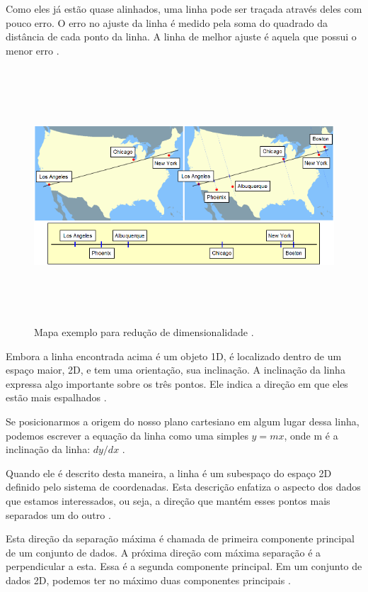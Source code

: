 Como eles já estão quase alinhados, uma linha pode ser traçada através deles com pouco erro. O erro no ajuste da linha é medido pela soma do quadrado da distância de cada ponto da linha. A linha de melhor ajuste é aquela que possui o menor erro \cite{hewitt}.

	\begin{figure}[hbt]
		\begin{center}
			\includegraphics[height=9.5cm,width=12.5cm]{figuras/2.FundamentacaoTeorica/PCAexemploMapa.png}
		\end{center}
		\caption{Mapa exemplo para redução de dimensionalidade \cite{hewitt}.}
		\label{exemploPCA}
	\end{figure}

Embora a linha encontrada acima é um objeto 1D, é localizado dentro de um espaço maior, 2D, e tem uma orientação, sua inclinação. A inclinação da linha expressa algo importante sobre os três pontos. Ele indica a direção em que eles estão mais espalhados \cite{hewitt}.


Se posicionarmos a origem do nosso plano cartesiano em algum lugar dessa linha, podemos escrever a equação da linha como uma simples $y = mx$, onde m é a inclinação da linha: $dy / dx$ \cite{hewitt}.

Quando ele é descrito desta maneira, a linha é um subespaço do espaço 2D definido pelo sistema de coordenadas. Esta descrição enfatiza o aspecto dos dados que estamos interessados, ou seja, a direção que mantém esses pontos mais separados um do outro \cite{hewitt}.

Esta direção da separação máxima é chamada de primeira componente principal de um conjunto de dados. A próxima direção com máxima separação é a perpendicular a esta. Essa é a segunda componente principal. Em um conjunto de dados 2D, podemos ter no máximo duas componentes principais \cite{hewitt}.


